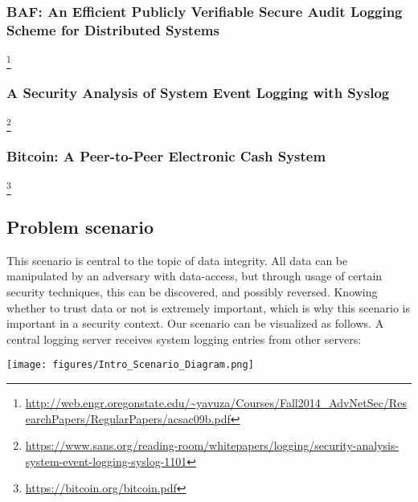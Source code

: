 \subsubsection{BAF: An Efficient Publicly Verifiable Secure Audit Logging Scheme for Distributed Systems}
\footnote{\raggedright \url{http://web.engr.oregonstate.edu/~yavuza/Courses/Fall2014_AdvNetSec/ResearchPapers/RegularPapers/acsac09b.pdf}}

\subsubsection{A Security Analysis of System Event Logging with Syslog}
\footnote{\raggedright \url{https://www.sans.org/reading-room/whitepapers/logging/security-analysis-system-event-logging-syslog-1101}}

\subsubsection{Bitcoin: A Peer-to-Peer Electronic Cash System}
\footnote{\url{https://bitcoin.org/bitcoin.pdf}}
\newpage

\subsection{Problem scenario}

This scenario is central to the topic of data integrity. All data can be manipulated by an adversary with data-access, but through usage of certain security techniques, this can be discovered, and possibly reversed. Knowing whether to trust data or not is extremely important, which is why this scenario is important in a security context.
Our scenario can be visualized as follows. A central logging server receives system logging entries from other servers:
\\

\begin{center}
    \texttt{[image: figures/Intro\_Scenario\_Diagram.png]}
\end{center}

